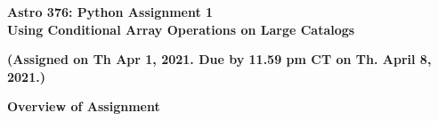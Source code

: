 \documentclass[11pt]{article}    %
\begin{document}
%
\setcounter{page}{0}
\setcounter{section}{0}

\begin{center}
\Large
{\bf Astro 376: Python Assignment 1 \\
Using Conditional Array Operations on Large Catalogs}

\vspace{4 mm}
\large
{\bf (Assigned on Th Apr 1, 2021. Due by 11.59 pm CT on Th. April 8, 2021.)}
\end{center}

%
%
%
%

\begin{center}
\vspace{3.0 mm}
\noindent
{\bf{ Overview of Assignment}} 
\end{center}
\end{document}
